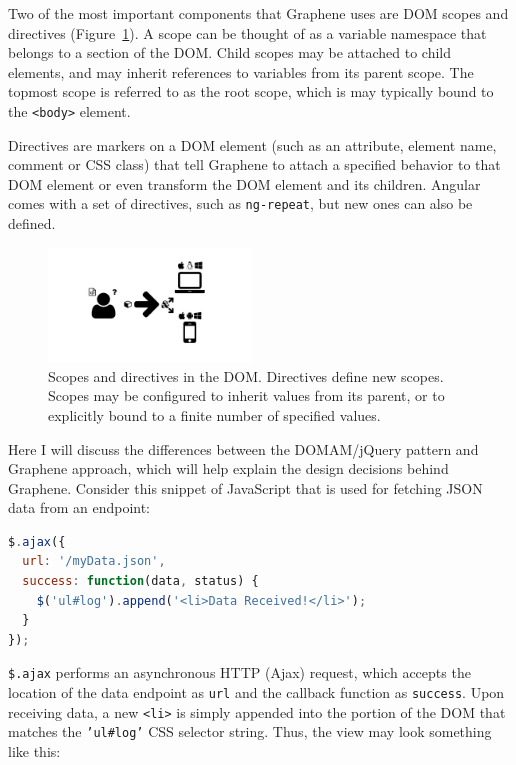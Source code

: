 Two of the most important components that Graphene uses are DOM scopes and directives (Figure~\ref{Figure:dom-scope}).
A scope can be thought of as a variable namespace that belongs to a section of the DOM.
Child scopes may be attached to child elements, and may inherit references to variables from its parent scope.
The topmost scope is referred to as the root scope, which is may typically bound to the \texttt{<body>} element.

Directives are markers on a DOM element (such as an attribute, element name, comment or CSS class) that tell Graphene to attach a specified behavior to that DOM element or even transform the DOM element and its children. \autocite{google2014angularDirectives, google2014angulardirectives2}
Angular comes with a set of directives, such as \texttt{ng-repeat}, but new ones can also be defined.

\begin{figure}
  \centering
  \includegraphics[width=0.48\textwidth, page=23, trim=0cm 0cm 11cm 0cm, clip=true]{images/Figures.pdf}
  \caption{Scopes and directives in the DOM. Directives define new scopes. Scopes may be configured to inherit values from its parent, or to explicitly bound to a finite number of specified values.}
  \label{Figure:dom-scope}
\end{figure}


Here I will discuss the differences between the DOMAM/jQuery pattern and Graphene approach, which will help explain the design decisions behind Graphene.
Consider this snippet of JavaScript that is used for fetching JSON data from an endpoint:

\begin{lstlisting}[language=JavaScript]
$.ajax({
  url: '/myData.json',
  success: function(data, status) {
    $('ul#log').append('<li>Data Received!</li>');
  }
});
\end{lstlisting}

\texttt{\$.ajax} performs an asynchronous HTTP (Ajax) request, which accepts the location of the data endpoint as \texttt{url} and the callback function as \texttt{success}.
Upon receiving data, a new \texttt{<li>} is simply appended into the portion of the DOM that matches the \texttt{'ul\#log'} CSS selector string.
Thus, the view may look something like this:

